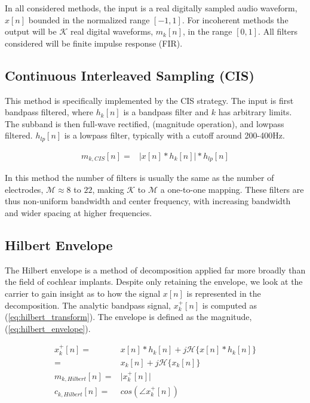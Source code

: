 \documentclass [11pt, proquest,oneside] {ganter_thesis}[2015/03/03]
\begin{document}
In all considered methods, the input is a real digitally sampled audio waveform, $x[n]$ bounded in the normalized range $[-1, 1]$.  For incoherent methods the output will be $\mathcal{K}$ real digital waveforms, $m_k[n]$, in the range $[0, 1]$.  All filters considered will be finite impulse response (FIR).

\subsection{Continuous Interleaved Sampling (CIS)}

This method is specifically implemented by the CIS strategy.  The input is first bandpass filtered, where $h_k[n]$ is a bandpass filter and $k$ has arbitrary limits.  The subband is then full-wave rectified, (magnitude operation), and lowpass filtered.  $h_{lp}[n]$ is a lowpass filter, typically with a cutoff around 200-400Hz.

\begin{align}
\label{eq:cis_envelope}
m_{k,CIS}[n] =& \Big| x[n] * h_k[n] \Big| * h_{lp}[n]
\end{align}

In this method the number of filters is usually the same as the number of electrodes, $\mathcal{M} \approx 8$ to $22$, making $\mathcal{K}$ to $\mathcal{M}$ a one-to-one mapping.  These filters are thus non-uniform bandwidth and center frequency, with increasing bandwidth and wider spacing at higher frequencies.

\subsection{Hilbert Envelope}

The Hilbert envelope is a method of decomposition applied far more broadly than the field of cochlear implants.  Despite only retaining the envelope, we look at the carrier to gain insight as to how the signal $x[n]$ is represented in the decomposition.  The analytic bandpass signal, $x^+_k[n]$ is computed as (\ref{eq:hilbert_transform}).  The envelope is defined as the magnitude, (\ref{eq:hilbert_envelope}).

\begin{align}
\label{eq:hilbert_transform}
x_k^+[n] =& x[n] * h_k[n] + j\mathcal{H}\{x[n] * h_k[n]\} \nonumber \\
=& x_k[n] + j\mathcal{H}\{x_k[n]\} \\
\label{eq:hilbert_envelope}
m_{k,Hilbert}[n] =& \Big| x^+_k[n] \Big| \\
c_{k,Hilbert}[n] =& cos(\angle x^+_k[n])
\end{align}
\end{document}

